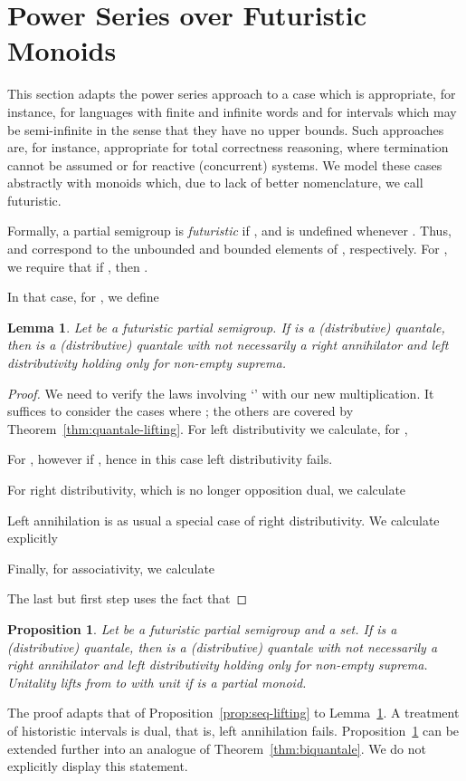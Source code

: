 \documentclass[12pt]{article}
\newtheorem{proposition}{Proposition}
\newtheorem{lemma}{Lemma}
\theoremstyle{definition}
\begin{document}
\section{Power Series over Futuristic Monoids}\label{sec:futuristic}

This section adapts the power series approach to a case which is
appropriate, for instance, for languages with finite and infinite
words and for intervals which may be semi-infinite in the sense that
they have no upper bounds.  Such approaches are, for instance,
appropriate for total correctness reasoning, where termination cannot
be assumed or for reactive (concurrent) systems. We model these cases
abstractly with monoids which, due to lack of better nomenclature, we
call futuristic.

Formally, a partial semigroup  is \emph{futuristic} if
,  and  is undefined
whenever . Thus,  and  correspond to the unbounded
and bounded elements of , respectively. For , we require that if
, then .

In that case, for , we define


\begin{lemma}
  \label{lem:futuristic-quantale}
  Let  be a futuristic partial semigroup. If  is a
  (distributive) quantale, then  is a (distributive) quantale
  with  not necessarily a right annihilator and left
  distributivity holding only for non-empty suprema.
\end{lemma}
\begin{proof}
  We need to verify the laws involving `' with our new
  multiplication. It suffices to consider the cases where ;
  the others are covered by Theorem~\ref{thm:quantale-lifting}. For
  left distributivity we calculate, for , 
  
  For , however  if , hence in this case left distributivity fails.

  For right distributivity, which is no longer opposition dual, we
  calculate
  
  Left annihilation is as usual a special case of right
  distributivity. We calculate explicitly

Finally, for associativity, we calculate
    
The last but first step uses the fact that 
\end{proof}
\begin{proposition}\label{prop:futuristic-biquantale}
  Let  be a futuristic partial semigroup and  a set.
  If  is a (distributive) quantale, then
   is a (distributive) quantale with
   not necessarily a right annihilator and left distributivity
  holding only for non-empty suprema. Unitality lifts from  to
   with unit  if  is a partial
  monoid.
\end{proposition}
The proof adapts that of Proposition~\ref{prop:seq-lifting} to
Lemma~\ref{lem:futuristic-quantale}. A treatment of historistic
intervals is dual, that is, left annihilation
fails. Proposition~\ref{prop:futuristic-biquantale} can be extended
further into an analogue of Theorem~\ref{thm:biquantale}. We do not
explicitly display this statement.
\end{document}
